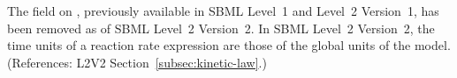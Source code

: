 The  field on \KineticLaw, previously available in
SBML Level~1 and Level~2 Version~1, has been removed as of SBML
Level~2 Version~2.  In SBML Level~2 Version~2, the time units of a
reaction rate expression are those of the global  units
of the model.  (References: L2V2
Section~\ref{subsec:kinetic-law}.)
